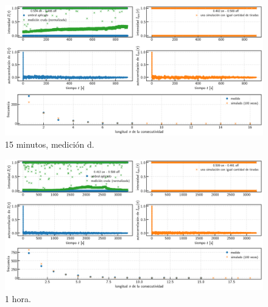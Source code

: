 \documentclass[a4paper]{article}
\begin{document}
\begin{figure}[!h]
	\centering
	\includegraphics[width=\linewidth]{Resultados/15min_d.png}
	\caption{15 minutos, medición d.}
\end{figure}

\begin{figure}[!h]
	\centering
	\includegraphics[width=\linewidth]{Resultados/1h.png}
	\caption{1 hora.}
\end{figure}
\end{document}
